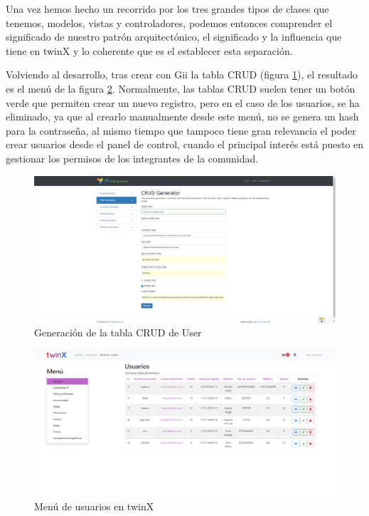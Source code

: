 Una vez hemos hecho un recorrido por los tres grandes tipos de clases que tenemos, modelos, vistas y controladores, podemos entonces comprender el significado de nuestro patrón arquitectónico, el significado y la influencia que tiene en twinX y lo coherente que es el establecer esta separación.

Volviendo al desarrollo, tras crear con Gii la tabla CRUD (figura \ref{fig:giicruduser}), el resultado es el menú de la figura \ref{fig:usuariostwinX}. Normalmente, las tablas CRUD suelen tener un botón verde que permiten crear un nuevo registro, pero en el caso de los usuarios, se ha eliminado, ya que al crearlo manualmente desde este menú, no se genera un hash para la contraseña, al mismo tiempo que tampoco tiene gran relevancia el poder crear usuarios desde el panel de control, cuando el principal interés está puesto en gestionar los permisos de los integrantes de la comunidad.

\begin{figure}
	\centering
	\includegraphics[width=\textwidth]{img/Capturas de twinX/gii_crud_user}
	\caption{Generación de la tabla CRUD de User}
	\label{fig:giicruduser}
\end{figure}


\begin{figure}
	\centering
	\includegraphics[width=\textwidth]{img/Capturas de twinX/usuarios_twinX}
	\caption{Menú de usuarios en twinX}
	\label{fig:usuariostwinX}
\end{figure}

